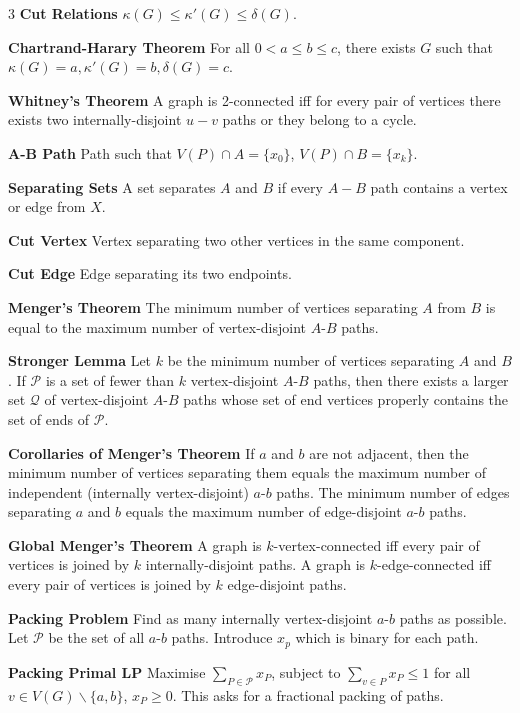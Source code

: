 \documentclass[10pt, landscape]{article}
\begin{document}
\begin{multicols*}{3}
\textbf{Cut Relations} $\kappa(G) \leq \kappa'(G) \leq \delta(G)$.

\textbf{Chartrand-Harary Theorem} For all $0 < a \leq b \leq c$, there exists $G$ such that $\kappa(G)=a, \kappa'(G)=b, \delta(G)=c$.

\textbf{Whitney's Theorem} A graph is 2-connected iff for every pair of vertices there exists two internally-disjoint $u-v$ paths or they belong to a cycle.

\textbf{A-B Path} Path such that $V(P) \cap A = \{ x_0 \}$, $V(P) \cap B = \{x_k\}$.

\textbf{Separating Sets} A set separates $A$ and $B$ if every $A-B$ path contains a vertex or edge from $X$.

\textbf{Cut Vertex} Vertex separating two other vertices in the same component.

\textbf{Cut Edge} Edge separating its two endpoints.

\textbf{Menger's Theorem} The minimum number of vertices separating $A$ from $B$ is equal to the maximum number of vertex-disjoint $A$-$B$ paths.

\textbf{Stronger Lemma} Let $k$ be the minimum number of vertices separating $A$ and $B$. If $\mathcal{P}$ is a set of fewer than $k$ vertex-disjoint $A$-$B$ paths, then there exists a larger set $\mathcal{Q}$ of vertex-disjoint $A$-$B$ paths whose set of end vertices properly contains the set of ends of $\mathcal{P}$.

\textbf{Corollaries of Menger's Theorem} If $a$ and $b$ are not adjacent, then the minimum number of vertices separating them equals the maximum number of independent (internally vertex-disjoint) $a$-$b$ paths. The minimum number of edges separating $a$ and $b$ equals the maximum number of edge-disjoint $a$-$b$ paths.

\textbf{Global Menger's Theorem} A graph is $k$-vertex-connected iff every pair of vertices is joined by $k$ internally-disjoint paths. A graph is $k$-edge-connected iff every pair of vertices is joined by $k$ edge-disjoint paths.

\textbf{Packing Problem} Find as many internally vertex-disjoint $a$-$b$ paths as possible. Let $\mathcal{P}$ be the set of all $a$-$b$ paths. Introduce $x_p$ which is binary for each path.

\textbf{Packing Primal LP} Maximise $\sum_{P \in \mathcal{P}}x_P$, subject to $\sum_{v \in P}x_P \leq 1$ for all $v \in V(G) \backslash\{a,b\}$, $x_P \geq 0$. This asks for a fractional packing of paths.


\end{multicols*}
\end{document}
